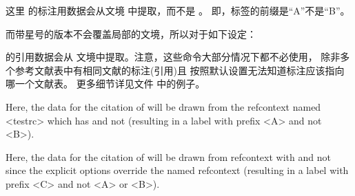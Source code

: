 \begin{ltxexample}[style=latex]{}
\cite{key1}
\begin{refcontext}[labelprefix=B]
\cite{key2}
\end{refcontext}
\end{ltxexample}
%

这里  的标注用数据会从文境  中提取，而不是 。
即，标签的前缀是“A”不是“B”。

而带星号的版本不会覆盖局部的文境，所以对于如下设定：

\begin{ltxexample}[style=latex]{}
\cite{key1}
\begin{refcontext}[labelprefix=B]
\cite{key2}
\end{refcontext}
\end{ltxexample}
%
 的引用数据会从  文境中提取。注意，这些命令大部分情况下都不必使用，
除非多个参考文献表中有相同文献的标注(引用)且 \biblatex 按照默认设置无法知道标注应该指向哪一个文献表。
更多细节详见文件  中的例子。
\begin{ltxexample}[style=latex]
\cite{key1}
\begin{refcontext}[labelprefix=B]
\cite{key2}
\end{refcontext}
\end{ltxexample}
%
Here, the data for the citation of  will be drawn from the refcontext named <testrc> which has  and not  (resulting in a label with prefix <A> and not <B>).

\begin{ltxexample}[style=latex]
\cite{key1}
\begin{refcontext}[labelprefix=B]
\cite{key2}
\end{refcontext}
\end{ltxexample}
%
Here, the data for the citation of  will be drawn from refcontext with  and not  since the explicit options override the named refcontext (resulting in a label with prefix <C> and not <A> or <B>).

